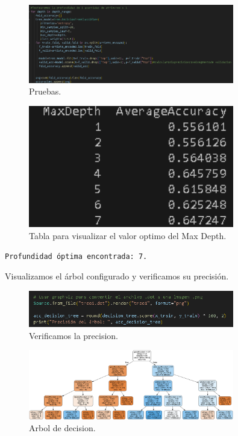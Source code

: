 \documentclass[a4paper,12pt]{article}
\begin{document}
\begin{figure}[H]
    \centering
    \includegraphics[width=0.8\textwidth]{27.png}
    \caption{Pruebas.}
    \label{fig:decision_tree}
\end{figure}

\begin{figure}[H]
    \centering
    \includegraphics[width=0.8\textwidth]{28.png}
    \caption{Tabla para visualizar el valor optimo del Max Depth.}
    \label{fig:decision_tree}
\end{figure}

\begin{verbatim}
Profundidad óptima encontrada: 7.
\end{verbatim}

Visualizamos el árbol configurado y verificamos su precisión.

\begin{figure}[H]
    \centering
    \includegraphics[width=0.8\textwidth]{29.png}
    \caption{Verificamos la precision.}
    \label{fig:decision_tree}
\end{figure}

\begin{figure}[H]
    \centering
    \includegraphics[width=0.8\textwidth]{../tree1.png}
    \caption{Arbol de decision.}
    \label{fig:decision_tree}
\end{figure}
\end{document}
